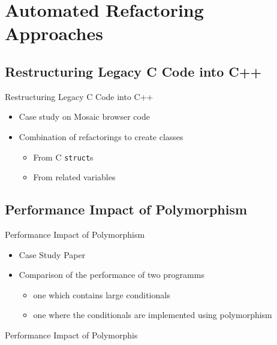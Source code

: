 \documentclass{beamer}
\begin{document}
\section{Automated Refactoring Approaches}

\subsection{Restructuring Legacy C Code into C++}

\begin{frame}{Restructuring Legacy C Code into C++}
	
	\begin{itemize}
		\item Case study on Mosaic browser code
		\pause
		\item Combination of refactorings to create classes
		\begin{itemize}
			\item From C \texttt{struct}s
			\item From related variables
		\end{itemize}
	\end{itemize}
\end{frame}

\subsection{Performance Impact of Polymorphism}

\begin{frame}{Performance Impact of Polymorphism}
  
  \begin{itemize}
    \item Case Study Paper
    \item Comparison of the performance of two programms
    \begin{itemize}
      \item one which contains large conditionals
      \item one where the conditionals are implemented using polymorphism
    \end{itemize}
  \end{itemize}
\end{frame}

\begin{frame}[fragile]{Performance Impact of Polymorphis}
	\begin{columns}[T]
		\begin{column}{.49\textwidth}
			
		\end{column}
		\begin{column}{.5\textwidth}
			
		\end{column}
	\end{columns}
\end{frame}
\end{document}
